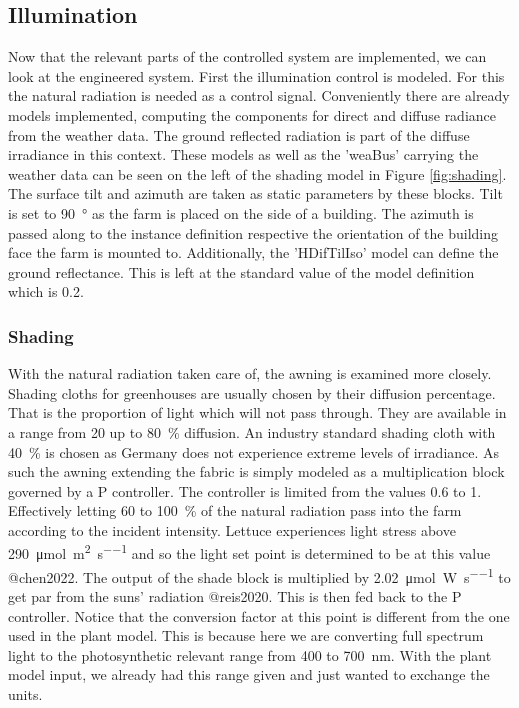 \subsection{Illumination}
Now that the relevant parts of the controlled system are implemented, we can look at the engineered system.
First the illumination control is modeled.
For this the natural radiation is needed as a control signal.
Conveniently there are already models implemented, computing the components for direct and diffuse radiance from the weather data.
The ground reflected radiation is part of the diffuse irradiance in this context.
These models as well as the 'weaBus' carrying the weather data can be seen on the left of the shading model in Figure \ref{fig:shading}.
The surface tilt and azimuth are taken as static parameters by these blocks.
Tilt is set to \SI{90}{\degree} as the farm is placed on the side of a building.
The azimuth is passed along to the instance definition respective the orientation of the building face the farm is mounted to.
Additionally, the 'HDifTilIso' model can define the ground reflectance.
This is left at the standard value of the model definition which is 0.2.

\subsubsection{Shading}
With the natural radiation taken care of, the awning is examined more closely.
Shading cloths for greenhouses are usually chosen by their diffusion percentage.
That is the proportion of light which will not pass through.
They are available in a range from 20 up to \SI{80}{\percent} diffusion.
An industry standard shading cloth with \SI{40}{\percent} is chosen as Germany does not experience extreme levels of irradiance.
As such the awning extending the fabric is simply modeled as a multiplication block governed by a P controller.
The controller is limited from the values 0.6 to 1.
Effectively letting 60 to \SI{100}{\percent} of the natural radiation pass into the farm according to the incident intensity.
Lettuce experiences light stress above \SI{290}{\umol\per\square\m\per\s} and so the light set point is determined to be at this value @chen2022.
The output of the shade block is multiplied by \SI{2.02}{\umol\per\W\per\s} to get \ac{par} from the suns' radiation @reis2020.
This is then fed back to the P controller.
Notice that the conversion factor at this point is different from the one used in the plant model.
This is because here we are converting full spectrum light to the photosynthetic relevant range from 400 to \SI{700}{\nm}.
With the plant model input, we already had this range given and just wanted to exchange the units.


